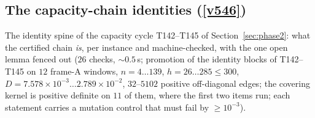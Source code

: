 \documentclass[11pt,a4paper]{article}
\begin{document}
\subsection{The capacity-chain identities (\texorpdfstring{\vref{v546}}{v546})}\label{sec:v546}
The identity spine of the capacity cycle T142--T145 of Section~\ref{sec:phase2}: what the
certified chain \emph{is}, per instance and machine-checked, with the one open lemma fenced
out  ($26$ checks, ${\sim}0.5$\,s; promotion of
the identity blocks of T142--T145 on $12$ frame-A windows, $n=4\ldots139$, $h=26\ldots285\le300$,
$D=7.578\times10^{-3}\ldots2.789\times10^{-2}$, $32$--$5102$ positive off-diagonal edges; the
covering kernel is positive definite on $11$ of them, where the first two items run; each
statement carries a mutation control that must fail by $\ge10^{-3}$).
\end{document}
